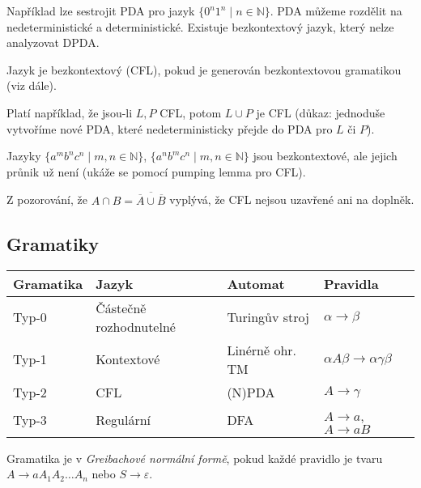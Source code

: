 Například lze sestrojit PDA pro jazyk
$\{ 0^n 1^n \mid n \in \mathbb{N} \}$.
PDA můžeme rozdělit na nedeterministické a deterministické. Existuje
bezkontextový jazyk, který nelze analyzovat DPDA.

\begin{definition}
    Jazyk je bezkontextový (CFL), pokud je generován bezkontextovou
    gramatikou (viz dále).
\end{definition}

Platí například, že jsou-li $L, P$ CFL, potom $L \cup P$ je CFL (důkaz:
jednoduše vytvoříme nové PDA, které nedeterministicky přejde do PDA pro
$L$ či $P$).

\begin{example}
    Jazyky
    $\{ a^m b^n c^n \mid m, n \in \mathbb{N} \}$,
    $\{ a^n b^m c^n \mid m, n \in \mathbb{N} \}$
    jsou bezkontextové, ale
    jejich průnik už není (ukáže se pomocí pumping lemma pro CFL).

    Z pozorování, že
    $A \cap B = \overline{\overline{A} \cup \overline{B}}$
    vyplývá, že CFL nejsou uzavřené ani na doplněk.
\end{example}

\subsection{Gramatiky}


\begin{longtable}[]{llll}
\toprule
Gramatika & Jazyk & Automat & Pravidla \tabularnewline
\midrule
\endhead
Typ-0 & Částečně rozhodnutelné & Turingův stroj & $\alpha \rightarrow \beta$ \tabularnewline
Typ-1 & Kontextové & Linérně ohr. TM & $\alpha A \beta \rightarrow \alpha \gamma \beta$ \tabularnewline
Typ-2 & CFL & (N)PDA &	$ A\rightarrow \gamma$ \tabularnewline
Typ-3 & Regulární & DFA & $A \rightarrow a$, $A \rightarrow aB$ \tabularnewline
\bottomrule
\end{longtable}


\bigskip

\begin{definition}
    Gramatika je v {\em Greibachové normální formě}, pokud
    každé pravidlo je tvaru
    $A \to a A_1 A_2 \ldots A_n$ nebo $S \to \varepsilon$.
\end{definition}

